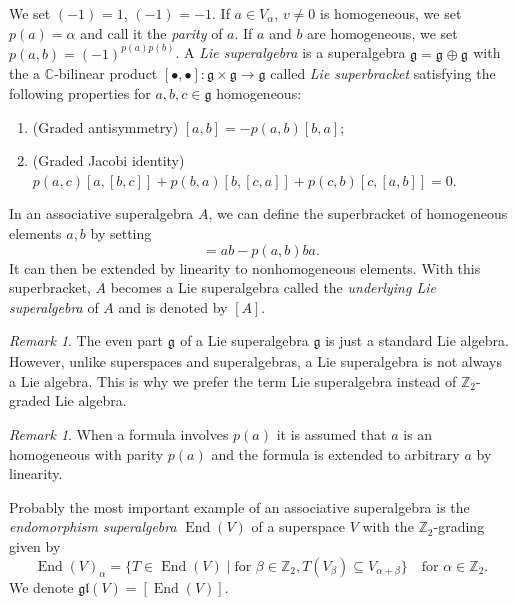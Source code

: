 \documentclass[a4paper, 12pt, reqno]{amsart}
\theoremstyle{remark}
\newtheorem{remark}[theorem]{Remark}
\numberwithin{equation}{subsection}
\DeclareMathOperator{\End}{End}
\DeclareMathOperator{\zero}{\overline{0}}
\DeclareMathOperator{\one}{\overline{1}}
\begin{document}
We set $(-1)^{\zero} = 1$, $(-1)^{\one} = -1$.
If $a \in V_\alpha$, $v\neq 0$ is homogeneous, we set $p(a) = \alpha$ and call it the \emph{parity} of $a$.
If $a$ and $b$ are homogeneous, we set $p(a, b) = (-1)^{p(a)p(b)}$.
A \emph{Lie superalgebra} is a superalgebra $\mathfrak{g} = \mathfrak{g}_{\zero} \oplus \mathfrak{g}_{\one}$ with the a $\mathbb{C}$-bilinear product $[\bullet, \bullet]: \mathfrak{g} \times \mathfrak{g} \to \mathfrak{g}$ called \emph{Lie superbracket} satisfying the following properties for $a, b, c \in \mathfrak{g}$ homogeneous:
\begin{enumerate}
\item (Graded antisymmetry) $[a, b] = -p(a, b)[b, a]$;
\item (Graded Jacobi identity) $p(a, c)[a, [b, c]] + p(b, a)[b, [c, a]] + p(c, b)[c, [a, b]] = 0$.
\end{enumerate}

In an associative superalgebra $A$, we can define the superbracket of homogeneous elements $a, b$ by setting
\begin{equation*}
  [a, b] = ab - p(a, b)ba.
\end{equation*}
It can then be extended by linearity to nonhomogeneous elements.
With this superbracket, $A$ becomes a Lie superalgebra called the \emph{underlying Lie superalgebra} of $A$ and is denoted by $[A]$.

\begin{remark}
  \label{rmk:2}
  The even part $\mathfrak{g}_{\zero}$ of a Lie superalgebra $\mathfrak{g}$ is just a standard Lie algebra.
  However, unlike superspaces and superalgebras, a Lie superalgebra is not always a Lie algebra.
  This is why we prefer the term Lie superalgebra instead of $\mathbb{Z}_2$-graded Lie algebra.
\end{remark}

\begin{remark}
  \label{rmk:3}
  When a formula involves $p(a)$ it is assumed that $a$ is an homogeneous with parity $p(a)$ and the formula is extended to arbitrary $a$ by linearity.
\end{remark}

Probably the most important example of an associative superalgebra is the \emph{endomorphism superalgebra} $\End(V)$ of a superspace $V$ with the $\mathbb{Z}_2$-grading given by
\begin{equation*}
  \End(V)_{\alpha} = \{T \in \End(V) \mid \text{for }\beta \in \mathbb{Z}_2, T(V_\beta) \subseteq V_{\alpha + \beta}\} \quad \text{for }\alpha \in \mathbb{Z}_2.
\end{equation*}
We denote $\mathfrak{gl}(V) = [\End(V)]$.
\end{document}
